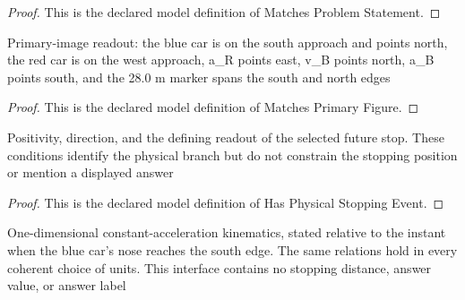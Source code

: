 \begin{proof}
  This is the declared model definition of Matches Problem Statement.
\end{proof}
\begin{definition}
  \label{def:physics:phyx-mini-0674:phyxminiproblems-problemphyxmini0674-matchesprimaryfigure}
  Primary-image readout: the blue car is on the south approach and points north, the red car is on the west approach, a\_R points east, v\_B points north, a\_B points south, and the 28.0 m marker spans the south and north edges
\end{definition}
\begin{proof}
  This is the declared model definition of Matches Primary Figure.
\end{proof}
\begin{definition}
  \label{def:physics:phyx-mini-0674:phyxminiproblems-problemphyxmini0674-hasphysicalstoppingevent}
  Positivity, direction, and the defining readout of the selected future stop. These conditions identify the physical branch but do not constrain the stopping position or mention a displayed answer
\end{definition}
\begin{proof}
  This is the declared model definition of Has Physical Stopping Event.
\end{proof}
\begin{definition}
  \label{def:physics:phyx-mini-0674:phyxminiproblems-problemphyxmini0674-satisfiesconstantaccelerationkinematics}
  One-dimensional constant-acceleration kinematics, stated relative to the instant when the blue car's nose reaches the south edge. The same relations hold in every coherent choice of units. This interface contains no stopping distance, answer value, or answer label
\end{definition}
